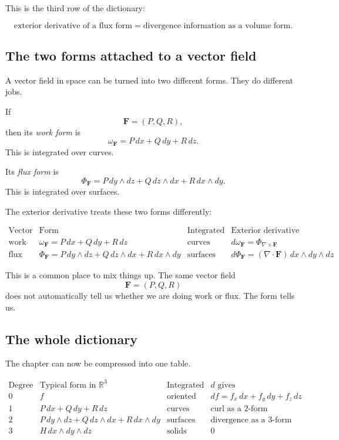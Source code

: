 This is the third row of the dictionary:

\[
\boxed{
    \text{exterior derivative of a flux form}
    =
    \text{divergence information as a volume form}.
}
\]

\subsection*{The two forms attached to a vector field}

A vector field in space can be turned into two different forms.  They do different
jobs.

If
\[
    \mathbf F=(P,Q,R),
\]
then its \emph{work form} is
\[
\boxed{
    \omega_{\mathbf F}=P\,dx+Q\,dy+R\,dz.
}
\]
This is integrated over curves.

Its \emph{flux form} is
\[
\boxed{
    \Phi_{\mathbf F}
    =
    P\,dy\wedge dz
    +
    Q\,dz\wedge dx
    +
    R\,dx\wedge dy.
}
\]
This is integrated over surfaces.

The exterior derivative treats these two forms differently:

\[
\begin{array}{c|c|c|c}
\text{Vector field used as} & \text{Form} & \text{Integrated over} & \text{Exterior derivative} \\ \hline
\text{work field} &
\omega_{\mathbf F}=P\,dx+Q\,dy+R\,dz &
\text{curves} &
d\omega_{\mathbf F}=\Phi_{\nabla\times\mathbf F}
\\[2mm]
\text{flux field} &
\Phi_{\mathbf F}=P\,dy\wedge dz+Q\,dz\wedge dx+R\,dx\wedge dy &
\text{surfaces} &
d\Phi_{\mathbf F}=(\nabla\cdot\mathbf F)\,dx\wedge dy\wedge dz
\end{array}
\]

This is a common place to mix things up.  The same vector field
\[
    \mathbf F=(P,Q,R)
\]
does not automatically tell us whether we are doing work or flux.  The form tells us.

\subsection*{The whole dictionary}

The chapter can now be compressed into one table.

\[
\begin{array}{c|c|c|c}
\text{Degree} & \text{Typical form in }\mathbb R^3
& \text{Integrated over} & d\text{ gives} \\ \hline
0 &
f &
\text{oriented points} &
df=f_x\,dx+f_y\,dy+f_z\,dz
\\[2mm]
1 &
P\,dx+Q\,dy+R\,dz &
\text{curves} &
\text{curl as a }2\text{-form}
\\[2mm]
2 &
P\,dy\wedge dz+Q\,dz\wedge dx+R\,dx\wedge dy &
\text{surfaces} &
\text{divergence as a }3\text{-form}
\\[2mm]
3 &
H\,dx\wedge dy\wedge dz &
\text{solids} &
0
\end{array}
\]

